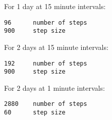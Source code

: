 For 1 day at 15 minute intervals:

\begin{verbatim}
96      number of steps
900     step size
\end{verbatim}

For 2 days at 15 minute intervals:

\begin{verbatim}
192     number of steps
900     step size
\end{verbatim}

For 2 days at 1 minute intervals:

\begin{verbatim}
2880    number of steps
60      step size
\end{verbatim}

